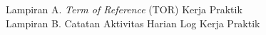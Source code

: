 
\vspace{0.5cm}
Lampiran A. \textit{Term of Reference} (TOR) Kerja Praktik \\
Lampiran B. Catatan Aktivitas Harian Log Kerja Praktik \\
